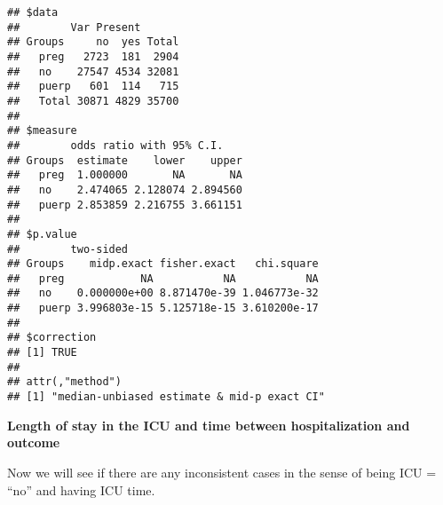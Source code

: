 \documentclass[
]{article}
\newenvironment{Shaded}{\begin{snugshade}}{\end{snugshade}}
\newcommand{\CommentTok}[1]{\textcolor[rgb]{0.56,0.35,0.01}{\textit{#1}}}
\newcommand{\DataTypeTok}[1]{\textcolor[rgb]{0.13,0.29,0.53}{#1}}
\newcommand{\KeywordTok}[1]{\textcolor[rgb]{0.13,0.29,0.53}{\textbf{#1}}}
\newcommand{\NormalTok}[1]{#1}
\newcommand{\OperatorTok}[1]{\textcolor[rgb]{0.81,0.36,0.00}{\textbf{#1}}}
\newcommand{\OtherTok}[1]{\textcolor[rgb]{0.56,0.35,0.01}{#1}}
\newcommand{\StringTok}[1]{\textcolor[rgb]{0.31,0.60,0.02}{#1}}
\begin{document}
\begin{verbatim}
## $data
##        Var Present
## Groups     no  yes Total
##   preg   2723  181  2904
##   no    27547 4534 32081
##   puerp   601  114   715
##   Total 30871 4829 35700
## 
## $measure
##        odds ratio with 95% C.I.
## Groups  estimate    lower    upper
##   preg  1.000000       NA       NA
##   no    2.474065 2.128074 2.894560
##   puerp 2.853859 2.216755 3.661151
## 
## $p.value
##        two-sided
## Groups    midp.exact fisher.exact   chi.square
##   preg            NA           NA           NA
##   no    0.000000e+00 8.871470e-39 1.046773e-32
##   puerp 3.996803e-15 5.125718e-15 3.610200e-17
## 
## $correction
## [1] TRUE
## 
## attr(,"method")
## [1] "median-unbiased estimate & mid-p exact CI"
\end{verbatim}

\textbf{Length of stay in the ICU and time between hospitalization and
outcome}

\begin{Shaded}
\end{Shaded}

Now we will see if there are any inconsistent cases in the sense of
being ICU = ``no'' and having ICU time.

\begin{Shaded}
\end{Shaded}
\end{document}

